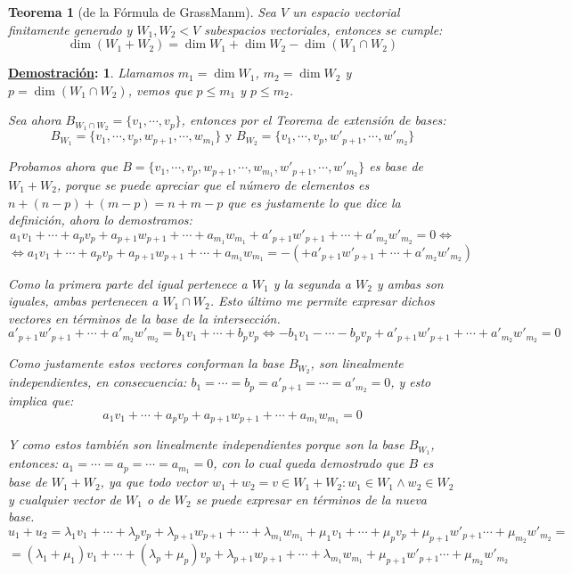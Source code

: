 \documentclass[10pt,a4paper,openright]{book}
\theoremstyle{break}
\newtheorem*{theo}{Teorema}
\newtheorem*{demo}{\underline{Demostración}:}
\begin{document}
\begin{theo}[de la Fórmula de GrassManm]
Sea $V$ un espacio vectorial finitamente generado y $W_1, W_2<V$ subespacios vectoriales, entonces se cumple:
$$\dim (W_1+W_2)=\dim W_1+\dim W_2-\dim (W_1\cap W_2)$$
\end{theo}
\begin{demo}
Llamamos $m_1=\dim W_1$, $m_2=\dim W_2$ y $p=\dim (W_1\cap W_2)$, vemos que $p\leq m_1$ y $p\leq m_2$.\par
Sea ahora $B_{W_1\cap W_2}=\{v_1, \cdots, v_p\}$, entonces por el Teorema de extensión de bases:
$$B_{W_1}=\{v_1, \cdots, v_p, w_{p+1}, \cdots, w_{m_1}\}\mbox{ y }B_{W_2}=\{v_1, \cdots, v_p, w'_{p+1}, \cdots, w'_{m_2}\}$$

Probamos ahora que $B=\{v_1, \cdots, v_p, w_{p+1}, \cdots, w_{m_1},w'_{p+1}, \cdots, w'_{m_2}\}$ es base de $W_1+W_2$, porque se puede apreciar que el número de elementos es $n+(n-p)+(m-p)=n+m-p$ que es justamente lo que dice la definición, ahora lo demostramos:
$$a_1v_1+\cdots+a_pv_p+a_{p+1}w_{p+1}+\cdots+a_{m_1}w_{m_1}+a'_{p+1}w'_{p+1}+\cdots+a'_{m_2}w'_{m_2}=0\Leftrightarrow$$
$$\Leftrightarrow a_1v_1+\cdots+a_pv_p+a_{p+1}w_{p+1}+\cdots+a_{m_1}w_{m_1}=-(+a'_{p+1}w'_{p+1}+\cdots+a'_{m_2}w'_{m_2})$$

Como la primera parte del igual pertenece a $W_1$ y la segunda a $W_2$ y ambas son iguales, ambas pertenecen a $W_1\cap W_2$. Esto último me permite expresar dichos vectores en términos de la base de la intersección.
$$a'_{p+1}w'_{p+1}+\cdots+a'_{m_2}w'_{m_2}=b_1v_1+\cdots+b_pv_p\Leftrightarrow -b_1v_1-\cdots-b_pv_p+a'_{p+1}w'_{p+1}+\cdots+a'_{m_2}w'_{m_2}=0$$

Como justamente estos vectores conforman la base $B_{W_2}$, son linealmente independientes, en consecuencia: $b_1=\cdots=b_p=a'_{p+1}=\cdots=a'_{m_2}=0$, y esto implica que:
$$a_1v_1+\cdots+a_pv_p+a_{p+1}w_{p+1}+\cdots+a_{m_1}w_{m_1}=0$$

Y como estos también son linealmente independientes porque son la base $B_{W_1}$, entonces: $a_1=\cdots=a_p=\cdots=a_{m_1}=0$, con lo cual queda demostrado que $B$ es base de $W_1+W_2$, ya que todo vector $w_1+w_2=v\in W_1+W_2: w_1\in W_1 \wedge w_2\in W_2$ y cualquier vector de $W_1$ o de $W_2$ se puede expresar en términos de la nueva base.
$$u_1+u_2=\lambda_1v_1+\cdots+\lambda_pv_p+\lambda_{p+1}w_{p+1}+\cdots+\lambda_{m_1}w_{m_1}+\mu_1v_1+\cdots+\mu_pv_p+\mu_{p+1}w'_{p+1}\cdots+\mu_{m_2}w'_{m_2}=$$
$$=(\lambda_1+\mu_1)v_1+\cdots+(\lambda_p+\mu_p)v_p+\lambda_{p+1}w_{p+1}+\cdots+\lambda_{m_1}w_{m_1}+\mu_{p+1}w'_{p+1}\cdots+\mu_{m_2}w'_{m_2}$$
\end{demo}
\end{document}
